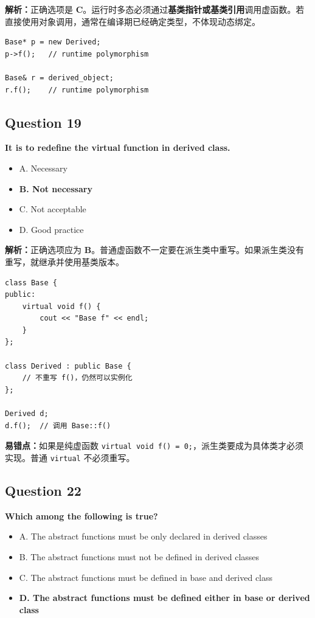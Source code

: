 \documentclass[11pt, a4paper]{article}
\begin{document}
\textbf{解析：}正确选项是 \textbf{C}。运行时多态必须通过\textbf{基类指针或基类引用}调用虚函数。若直接使用对象调用，通常在编译期已经确定类型，不体现动态绑定。
\begin{lstlisting}
Base* p = new Derived;
p->f();   // runtime polymorphism

Base& r = derived_object;
r.f();    // runtime polymorphism
\end{lstlisting}


\subsection*{Question 19}
\textbf{It is \underline{\hspace{2cm}} to redefine the virtual function in derived class.}
\begin{itemize}
    \item A. Necessary
    \item \textbf{B. Not necessary}
    \item C. Not acceptable
    \item D. Good practice
\end{itemize}

\textbf{解析：}正确选项应为 \textbf{B}。普通虚函数不一定要在派生类中重写。如果派生类没有重写，就继承并使用基类版本。
\begin{lstlisting}
class Base {
public:
    virtual void f() {
        cout << "Base f" << endl;
    }
};

class Derived : public Base {
    // 不重写 f()，仍然可以实例化
};

Derived d;
d.f();  // 调用 Base::f()
\end{lstlisting}

\textbf{易错点：}如果是纯虚函数 \texttt{virtual void f() = 0;}，派生类要成为具体类才必须实现。普通 \texttt{virtual} 不必须重写。


\subsection*{Question 22}
\textbf{Which among the following is true?}
\begin{itemize}
    \item A. The abstract functions must be only declared in derived classes
    \item B. The abstract functions must not be defined in derived classes
    \item C. The abstract functions must be defined in base and derived class
    \item \textbf{D. The abstract functions must be defined either in base or derived class}
\end{itemize}
\end{document}
